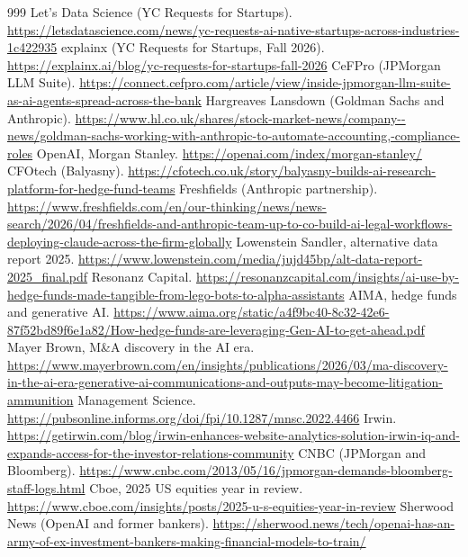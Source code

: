 \documentclass[10pt,a4paper]{article}
\begin{document}
\begin{thebibliography}{999}
 Let's Data Science (YC Requests for Startups). \url{https://letsdatascience.com/news/yc-requests-ai-native-startups-across-industries-1c422935}
 explainx (YC Requests for Startups, Fall 2026). \url{https://explainx.ai/blog/yc-requests-for-startups-fall-2026}
 CeFPro (JPMorgan LLM Suite). \url{https://connect.cefpro.com/article/view/inside-jpmorgan-llm-suite-as-ai-agents-spread-across-the-bank}
 Hargreaves Lansdown (Goldman Sachs and Anthropic). \url{https://www.hl.co.uk/shares/stock-market-news/company--news/goldman-sachs-working-with-anthropic-to-automate-accounting,-compliance-roles}
 OpenAI, Morgan Stanley. \url{https://openai.com/index/morgan-stanley/}
 CFOtech (Balyasny). \url{https://cfotech.co.uk/story/balyasny-builds-ai-research-platform-for-hedge-fund-teams}
 Freshfields (Anthropic partnership). \url{https://www.freshfields.com/en/our-thinking/news/news-search/2026/04/freshfields-and-anthropic-team-up-to-co-build-ai-legal-workflows-deploying-claude-across-the-firm-globally}
 Lowenstein Sandler, alternative data report 2025. \url{https://www.lowenstein.com/media/jujd45bp/alt-data-report-2025_final.pdf}
 Resonanz Capital. \url{https://resonanzcapital.com/insights/ai-use-by-hedge-funds-made-tangible-from-lego-bots-to-alpha-assistants}
 AIMA, hedge funds and generative AI. \url{https://www.aima.org/static/a4f9bc40-8c32-42e6-87f52bd89f6e1a82/How-hedge-funds-are-leveraging-Gen-AI-to-get-ahead.pdf}
 Mayer Brown, M\&A discovery in the AI era. \url{https://www.mayerbrown.com/en/insights/publications/2026/03/ma-discovery-in-the-ai-era-generative-ai-communications-and-outputs-may-become-litigation-ammunition}
 Management Science. \url{https://pubsonline.informs.org/doi/fpi/10.1287/mnsc.2022.4466}
 Irwin. \url{https://getirwin.com/blog/irwin-enhances-website-analytics-solution-irwin-iq-and-expands-access-for-the-investor-relations-community}
 CNBC (JPMorgan and Bloomberg). \url{https://www.cnbc.com/2013/05/16/jpmorgan-demands-bloomberg-staff-logs.html}
 Cboe, 2025 US equities year in review. \url{https://www.cboe.com/insights/posts/2025-u-s-equities-year-in-review}
 Sherwood News (OpenAI and former bankers). \url{https://sherwood.news/tech/openai-has-an-army-of-ex-investment-bankers-making-financial-models-to-train/}

\end{thebibliography}
\end{document}
